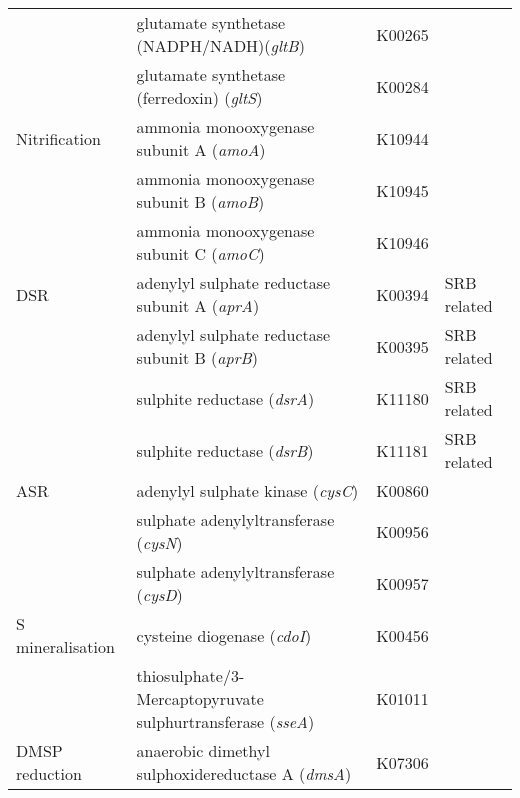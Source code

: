 \begin{longtable}{p{2.7cm}p{7.5cm}p{1cm}p{1.8cm}}
 & glutamate synthetase (NADPH/NADH)(\emph{gltB}) & K00265 &  \\
 & glutamate synthetase (ferredoxin) (\emph{gltS}) & K00284 &  \\
Nitrification & ammonia monooxygenase subunit A (\emph{amoA}) & K10944 &  \\
 & ammonia monooxygenase subunit B (\emph{amoB}) & K10945 &  \\
 & ammonia monooxygenase subunit C (\emph{amoC}) & K10946 &  \\
DSR & adenylyl sulphate reductase subunit A (\emph{aprA}) & K00394 & SRB related \\
 & adenylyl sulphate reductase subunit B (\emph{aprB}) & K00395 & SRB related \\
 & sulphite reductase (\emph{dsrA}) & K11180 & SRB related \\
 & sulphite reductase (\emph{dsrB}) & K11181 & SRB related \\
ASR & adenylyl sulphate kinase (\emph{cysC}) & K00860 &  \\
 & sulphate adenylyltransferase (\emph{cysN}) & K00956 &  \\
 & sulphate adenylyltransferase (\emph{cysD}) & K00957 &  \\
S mineralisation & cysteine diogenase (\emph{cdoI}) & K00456 &  \\
 & thiosulphate/3-Mercaptopyruvate sulphurtransferase (\emph{sseA}) & K01011 &  \\
DMSP reduction & anaerobic dimethyl sulphoxidereductase A (\emph{dmsA}) & K07306 &  \\
\end{longtable}
\endgroup

